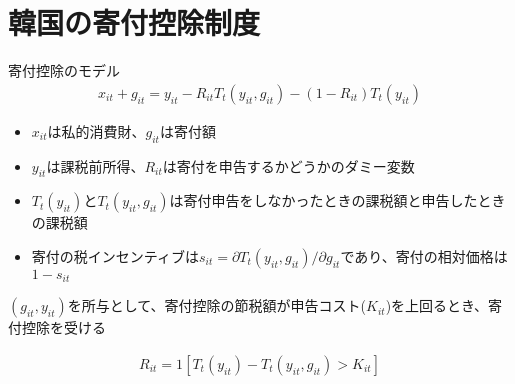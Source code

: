 \documentclass[
  ignorenonframetext,
  aspectratio=169,
]{beamer}
\providecommand{\tightlist}{%
  \setlength{\itemsep}{0pt}\setlength{\parskip}{0pt}}
\begin{document}
\hypertarget{ux97d3ux56fdux306eux5bc4ux4ed8ux63a7ux9664ux5236ux5ea6}{%
\section{韓国の寄付控除制度}\label{ux97d3ux56fdux306eux5bc4ux4ed8ux63a7ux9664ux5236ux5ea6}}

\begin{frame}{寄付控除のモデル}
\protect\hypertarget{ux5bc4ux4ed8ux63a7ux9664ux306eux30e2ux30c7ux30eb}{}
\begin{align}
  x_{it} + g_{it} = y_{it} - R_{it}T_t(y_{it}, g_{it}) - (1 - R_{it}) T_t(y_{it})
\end{align}

\begin{itemize}
\tightlist
\item
  \(x_{it}\)は私的消費財、\(g_{it}\)は寄付額
\item
  \(y_{it}\)は課税前所得、\(R_{it}\)は寄付を申告するかどうかのダミー変数
\item
  \(T_t(y_{it})\)と\(T_t(y_{it}, g_{it})\)は寄付申告をしなかったときの課税額と申告したときの課税額
\item
  寄付の税インセンティブは\(s_{it} = \partial T_t(y_{it}, g_{it}) / \partial g_{it}\)であり、寄付の相対価格は\(1 - s_{it}\)
\end{itemize}

\((g_{it}, y_{it})\)を所与として、寄付控除の節税額が申告コスト(\(K_{it}\))を上回るとき、寄付控除を受ける

\begin{align}
  R_{it} = 1[T_t(y_{it}) - T_t(y_{it}, g_{it}) > K_{it}]
\end{align}
\end{frame}
\end{document}
